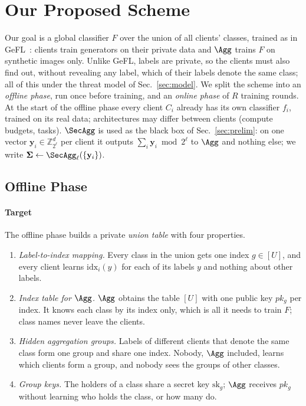 \section{Our Proposed Scheme}
\label{sec:scheme}

Our goal is a global classifier $F$ over the union of all clients' classes, trained as in
GeFL~\cite{gefl}: clients train generators on their private data and $\Agg$ trains $F$ on synthetic
images only. Unlike GeFL, labels are private, so the clients must also find out, without revealing
any label, which of their labels denote the same class; all of this under the threat model of
Sec.~\ref{sec:model}. We split the scheme into an \emph{offline phase}, run once before training,
and an \emph{online phase} of $R$ training rounds. At the start of the offline phase every client
$C_i$ already has its own classifier $f_i$, trained on its real data; architectures may differ
between clients (compute budgets, tasks). $\SecAgg$ is used as the black box of
Sec.~\ref{sec:prelim}: on one vector $\mathbf{y}_i\in\mathbb{Z}_{2^\ell}^{d}$ per client it outputs
$\sum_i\mathbf{y}_i\bmod 2^\ell$ to $\Agg$ and nothing else; we write
$\boldsymbol\Sigma\gets\SecAgg_\ell(\{\mathbf{y}_i\})$.

\subsection{Offline Phase}
\label{sec:offline}

\paragraph{Target}
The offline phase builds a private \emph{union table} with four properties.
\begin{enumerate}[label=(O\arabic*),leftmargin=*,itemsep=0pt]
  \item \emph{Label-to-index mapping.} Every class in the union gets one index $g\in[U]$, and every
  client learns $\mathrm{idx}_i(y)$ for each of its labels $y$ and nothing about other labels.
  \item \emph{Index table for $\Agg$.} $\Agg$ obtains the table $[U]$ with one public key $pk_g$ per
  index. It knows each class by its index only, which is all it needs to train $F$; class names
  never leave the clients.
  \item \emph{Hidden aggregation groups.} Labels of different clients that denote the same class
  form one group and share one index. Nobody, $\Agg$ included, learns which clients form a group,
  and nobody sees the groups of other classes.
  \item \emph{Group keys.} The holders of a class share a secret key $\mathrm{sk}_g$; $\Agg$
  receives $pk_g$ without learning who holds the class, or how many do.
\end{enumerate}

